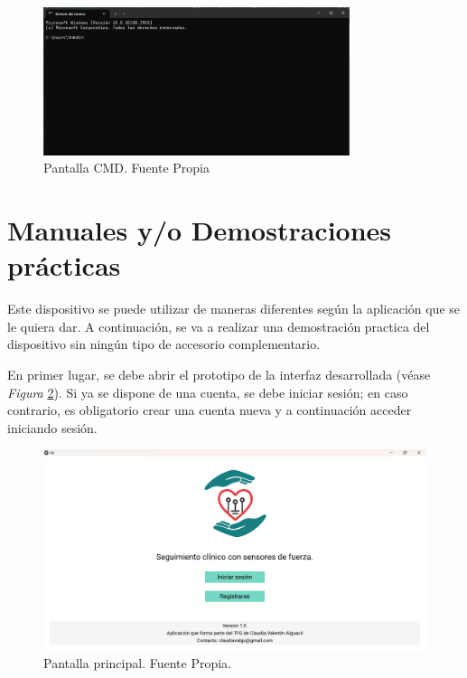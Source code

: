 \begin{figure}[h]
    \centering
    \includegraphics[width=0.8\textwidth]{img/pantalla CMD.png}
    \caption{Pantalla CMD. Fuente Propia}
    \label{fig:CMD}
\end{figure}
\section{Manuales y/o Demostraciones prácticas}  

Este dispositivo se puede utilizar de maneras diferentes según la aplicación que se le quiera dar. A continuación, se va a realizar una demostración practica del dispositivo sin ningún tipo de accesorio complementario. 

En primer lugar, se debe abrir el prototipo de la interfaz desarrollada (véase \textit{Figura} \ref{fig:Pantalla principal}). Si ya se dispone de una cuenta, se debe iniciar sesión; en caso contrario, es obligatorio crear una cuenta nueva y a continuación acceder iniciando sesión.

 \begin{figure}
        \centering
        \includegraphics[width=1\linewidth]{img/Pantalla principal.png}
        \caption{Pantalla principal. Fuente Propia.}
        \label{fig:Pantalla principal}
\end{figure}

